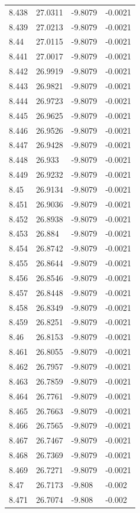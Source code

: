 \begin{tabular}{llll}
8.438 & 27.0311 & -9.8079 & -0.0021 \\
8.439 & 27.0213 & -9.8079 & -0.0021 \\
8.44 & 27.0115 & -9.8079 & -0.0021 \\
8.441 & 27.0017 & -9.8079 & -0.0021 \\
8.442 & 26.9919 & -9.8079 & -0.0021 \\
8.443 & 26.9821 & -9.8079 & -0.0021 \\
8.444 & 26.9723 & -9.8079 & -0.0021 \\
8.445 & 26.9625 & -9.8079 & -0.0021 \\
8.446 & 26.9526 & -9.8079 & -0.0021 \\
8.447 & 26.9428 & -9.8079 & -0.0021 \\
8.448 & 26.933 & -9.8079 & -0.0021 \\
8.449 & 26.9232 & -9.8079 & -0.0021 \\
8.45 & 26.9134 & -9.8079 & -0.0021 \\
8.451 & 26.9036 & -9.8079 & -0.0021 \\
8.452 & 26.8938 & -9.8079 & -0.0021 \\
8.453 & 26.884 & -9.8079 & -0.0021 \\
8.454 & 26.8742 & -9.8079 & -0.0021 \\
8.455 & 26.8644 & -9.8079 & -0.0021 \\
8.456 & 26.8546 & -9.8079 & -0.0021 \\
8.457 & 26.8448 & -9.8079 & -0.0021 \\
8.458 & 26.8349 & -9.8079 & -0.0021 \\
8.459 & 26.8251 & -9.8079 & -0.0021 \\
8.46 & 26.8153 & -9.8079 & -0.0021 \\
8.461 & 26.8055 & -9.8079 & -0.0021 \\
8.462 & 26.7957 & -9.8079 & -0.0021 \\
8.463 & 26.7859 & -9.8079 & -0.0021 \\
8.464 & 26.7761 & -9.8079 & -0.0021 \\
8.465 & 26.7663 & -9.8079 & -0.0021 \\
8.466 & 26.7565 & -9.8079 & -0.0021 \\
8.467 & 26.7467 & -9.8079 & -0.0021 \\
8.468 & 26.7369 & -9.8079 & -0.0021 \\
8.469 & 26.7271 & -9.8079 & -0.0021 \\
8.47 & 26.7173 & -9.808 & -0.002 \\
8.471 & 26.7074 & -9.808 & -0.002 \\

\end{tabular}
